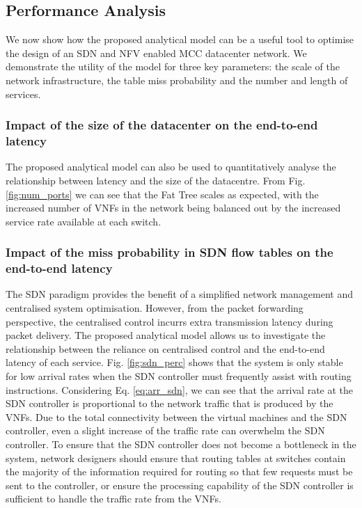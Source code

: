 \subsection{Performance Analysis}
We now show how the proposed analytical model can be a useful tool to optimise the design of an SDN and NFV enabled MCC datacenter network. We demonstrate the utility of the model for three key parameters: the scale of the network infrastructure, the table miss probability and the number and length of services.

\subsubsection{Impact of the size of the datacenter on the end-to-end latency}
The proposed analytical model can also be used to quantitatively analyse the relationship between latency and the size of the datacentre. From Fig. \ref{fig:num_ports} we can see that the Fat Tree scales as expected, with the increased number of VNFs in the network being balanced out by the increased service rate available at each switch. 

\subsubsection{Impact of the miss probability in SDN flow tables on the end-to-end latency}
The SDN paradigm provides the benefit of a simplified network management and centralised system optimisation. However, from the packet forwarding perspective, the centralised control incurrs extra transmission latency during packet delivery. The proposed analytical model allows us to investigate the relationship between the reliance on centralised control and the end-to-end latency of each service. Fig. \ref{fig:sdn_perc} shows that the system is only stable for low arrival rates when the SDN controller must frequently assist with routing instructions. Considering Eq. \ref{eq:arr_sdn}, we can see that the arrival rate at the SDN controller is proportional to the network traffic that is produced by the VNFs. Due to the total connectivity between the virtual machines and the SDN controller, even a slight increase of the traffic rate can overwhelm the SDN controller. To ensure that the SDN controller does not become a bottleneck in the system, network designers should ensure that routing tables at switches contain the majority of the information required for routing so that few requests must be sent to the controller, or ensure the processing capability of the SDN controller is sufficient to handle the traffic rate from the VNFs.

